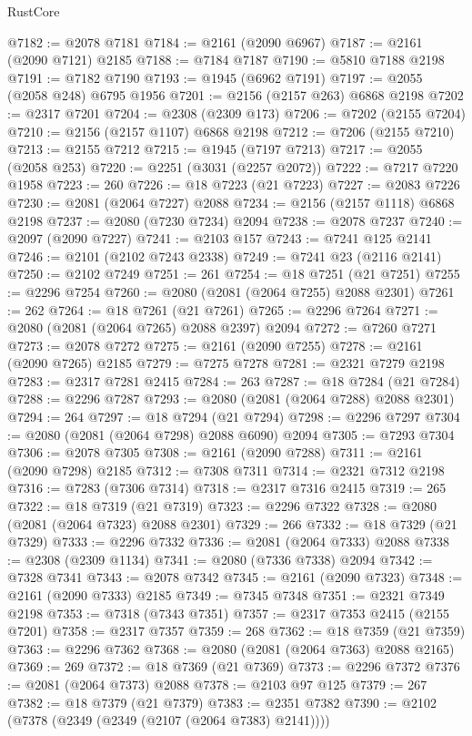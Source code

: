 \begin{lexlean}{RustCore}
\begin{coremodule}
@7182 := @2078 @7181
@7184 := @2161 (@2090 @6967)
@7187 := @2161 (@2090 @7121) @2185
@7188 := @7184 @7187
@7190 := @5810 @7188 @2198
@7191 := @7182 @7190
@7193 := @1945 (@6962 @7191)
@7197 := @2055 (@2058 @248) @6795 @1956
@7201 := @2156 (@2157 @263) @6868 @2198
@7202 := @2317 @7201
@7204 := @2308 (@2309 @173)
@7206 := @7202 (@2155 @7204)
@7210 := @2156 (@2157 @1107) @6868 @2198
@7212 := @7206 (@2155 @7210)
@7213 := @2155 @7212
@7215 := @1945 (@7197 @7213)
@7217 := @2055 (@2058 @253)
@7220 := @2251 (@3031 (@2257 @2072))
@7222 := @7217 @7220 @1958
@7223 := 260
@7226 := @18 @7223 (@21 @7223)
@7227 := @2083 @7226
@7230 := @2081 (@2064 @7227) @2088
@7234 := @2156 (@2157 @1118) @6868 @2198
@7237 := @2080 (@7230 @7234) @2094
@7238 := @2078 @7237
@7240 := @2097 (@2090 @7227)
@7241 := @2103 @157
@7243 := @7241 @125 @2141
@7246 := @2101 (@2102 @7243 @2338)
@7249 := @7241 @23 (@2116 @2141)
@7250 := @2102 @7249
@7251 := 261
@7254 := @18 @7251 (@21 @7251)
@7255 := @2296 @7254
@7260 := @2080 (@2081 (@2064 @7255) @2088 @2301)
@7261 := 262
@7264 := @18 @7261 (@21 @7261)
@7265 := @2296 @7264
@7271 := @2080 (@2081 (@2064 @7265) @2088 @2397) @2094
@7272 := @7260 @7271
@7273 := @2078 @7272
@7275 := @2161 (@2090 @7255)
@7278 := @2161 (@2090 @7265) @2185
@7279 := @7275 @7278
@7281 := @2321 @7279 @2198
@7283 := @2317 @7281 @2415
@7284 := 263
@7287 := @18 @7284 (@21 @7284)
@7288 := @2296 @7287
@7293 := @2080 (@2081 (@2064 @7288) @2088 @2301)
@7294 := 264
@7297 := @18 @7294 (@21 @7294)
@7298 := @2296 @7297
@7304 := @2080 (@2081 (@2064 @7298) @2088 @6090) @2094
@7305 := @7293 @7304
@7306 := @2078 @7305
@7308 := @2161 (@2090 @7288)
@7311 := @2161 (@2090 @7298) @2185
@7312 := @7308 @7311
@7314 := @2321 @7312 @2198
@7316 := @7283 (@7306 @7314)
@7318 := @2317 @7316 @2415
@7319 := 265
@7322 := @18 @7319 (@21 @7319)
@7323 := @2296 @7322
@7328 := @2080 (@2081 (@2064 @7323) @2088 @2301)
@7329 := 266
@7332 := @18 @7329 (@21 @7329)
@7333 := @2296 @7332
@7336 := @2081 (@2064 @7333) @2088
@7338 := @2308 (@2309 @1134)
@7341 := @2080 (@7336 @7338) @2094
@7342 := @7328 @7341
@7343 := @2078 @7342
@7345 := @2161 (@2090 @7323)
@7348 := @2161 (@2090 @7333) @2185
@7349 := @7345 @7348
@7351 := @2321 @7349 @2198
@7353 := @7318 (@7343 @7351)
@7357 := @2317 @7353 @2415 (@2155 @7201)
@7358 := @2317 @7357
@7359 := 268
@7362 := @18 @7359 (@21 @7359)
@7363 := @2296 @7362
@7368 := @2080 (@2081 (@2064 @7363) @2088 @2165)
@7369 := 269
@7372 := @18 @7369 (@21 @7369)
@7373 := @2296 @7372
@7376 := @2081 (@2064 @7373) @2088
@7378 := @2103 @97 @125
@7379 := 267
@7382 := @18 @7379 (@21 @7379)
@7383 := @2351 @7382
@7390 := @2102 (@7378 (@2349 (@2349 (@2107 (@2064 @7383) @2141))))

\end{coremodule}
\end{lexlean}
